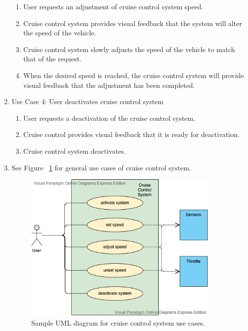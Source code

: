 \documentclass[preprint,11pt,3p]{article}
\begin{document}
\begin{enumerate}
\begin{enumerate}
			\item User requests an adjustment of cruise control system speed.
			\item Cruise control system provides visual feedback that the system will alter the speed of the vehicle.
			\item Cruise control system slowly adjusts the speed of the vehicle to match that of the request.
			\item When the desired speed is reached, the cruise control system will provide visual feedback that the adjustment has been completed.
		\end{enumerate}
	\item Use Case 4: User deactivates cruise control system
		\begin{enumerate}
			\item User requests a deactivation of the cruise control system.
			\item Cruise control provides visual feedback that it is ready for deactivation.
			\item Cruise control system deactivates.
		\end{enumerate}
	\item See Figure ~\ref{fig:ccUML1} for general use cases of cruise control system.
		\begin{figure}[H]
			\includegraphics[width=0.9\textwidth]{images/useCaseUML.png}
			\caption{Sample UML diagram for cruise control system use cases.}
			\label{fig:ccUML1}
		\end{figure}
\end{enumerate}
\end{document}
